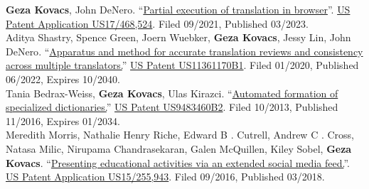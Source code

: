 
{\small \textbf{Geza Kovacs}, John DeNero}. ``\href{https://patents.google.com/patent/US20230070302A1}{Partial execution of translation in browser}''. \hypersetup{urlcolor=black}\href{https://patents.google.com/patent/US20230070302A1}{US Patent Application US17/468,524}\hypersetup{urlcolor=linkcol}. Filed 09/2021, Published 03/2023.\\

{\small Aditya Shastry, Spence Green, Joern Wuebker,} \textbf{Geza Kovacs}, {\small Jessy Lin, John DeNero}. ``\href{https://patents.google.com/patent/US11361170B1}{Apparatus and method for accurate translation reviews and consistency across multiple translators.}'' \hypersetup{urlcolor=black}\href{https://patents.google.com/patent/US11361170B1}{US Patent US11361170B1}\hypersetup{urlcolor=linkcol}. Filed 01/2020, Published 06/2022, Expires 10/2040.\\

{\small Tania Bedrax-Weiss,} \textbf{Geza Kovacs}, {\small Ulas Kirazci.} ``\href{https://patents.google.com/patent/US9483460B2}{Automated formation of specialized dictionaries.}'' \hypersetup{urlcolor=black}\href{https://patents.google.com/patent/US9483460B2}{US Patent US9483460B2}\hypersetup{urlcolor=linkcol}. Filed 10/2013, Published 11/2016, Expires 01/2034.\\

{\small Meredith Morris, Nathalie Henry Riche, Edward B . Cutrell, Andrew C . Cross, Natasa Milic, Nirupama Chandrasekaran, Galen McQuillen, Kiley Sobel,} \textbf{Geza Kovacs}. ``\href{https://patents.google.com/patent/US20180068578A1}{Presenting educational activities via an extended social media feed.}''. \hypersetup{urlcolor=black}\href{https://patents.google.com/patent/US20180068578A1}{US Patent Application US15/255,943}\hypersetup{urlcolor=linkcol}.  Filed 09/2016, Published 03/2018.\\ %